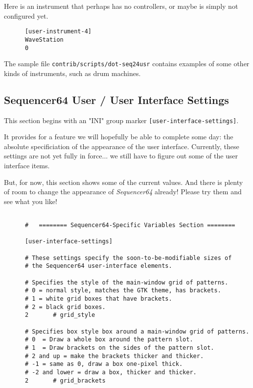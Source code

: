    Here is an instrument that perhaps has no controllers, or maybe is simply
   not configured yet.

   \begin{verbatim}
      [user-instrument-4]
      WaveStation
      0
   \end{verbatim}

   The sample file \texttt{contrib/scripts/dot-seq24usr} contains examples
   of some other kinds of instruments, such as drum machines.

\subsection{Sequencer64 User / User Interface Settings}
\label{subsec:seq64_usr_file_user_interface_settings}

   This section begins with an
   "INI" group marker \texttt{[user-interface-settings]}.

   It provides for a feature we will hopefully be able to complete some day:
   the absolute specificiation of the appearance of the user interface.
   Currently, these settings are not yet fully in force... we still have to
   figure out some of the user interface items.

   But, for now, this section shows some of the current values.
   And there is plenty of room to change the appearance of
   \textsl{Sequencer64} already!  Please try them and see what you like!

   \begin{verbatim}

      #   ======== Sequencer64-Specific Variables Section ========

      [user-interface-settings]

      # These settings specify the soon-to-be-modifiable sizes of
      # the Sequencer64 user-interface elements.

      # Specifies the style of the main-window grid of patterns.
      # 0 = normal style, matches the GTK theme, has brackets.
      # 1 = white grid boxes that have brackets.
      # 2 = black grid boxes.
      2       # grid_style

      # Specifies box style box around a main-window grid of patterns.
      # 0  = Draw a whole box around the pattern slot.
      # 1  = Draw brackets on the sides of the pattern slot.
      # 2 and up = make the brackets thicker and thicker.
      # -1 = same as 0, draw a box one-pixel thick.
      # -2 and lower = draw a box, thicker and thicker.
      2       # grid_brackets
   \end{verbatim}

